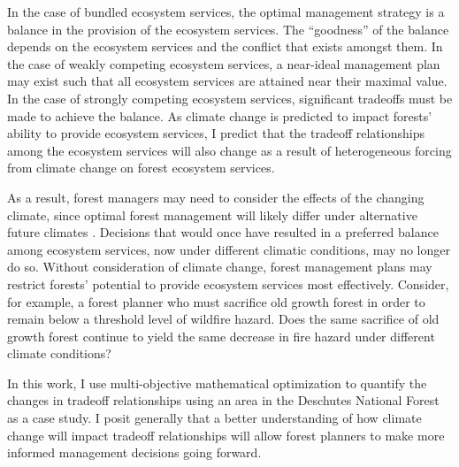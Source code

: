In the case of bundled ecosystem services, the optimal management strategy is a balance in the provision of the ecosystem services. The ``goodness'' of the balance depends on the ecosystem services and the conflict that exists amongst them. In the case of weakly competing ecosystem services, a near-ideal management plan may exist such that all ecosystem services are attained near their maximal value. In the case of strongly competing ecosystem services, significant tradeoffs must be made to achieve the balance. As climate change is predicted to impact forests' ability to provide ecosystem services, I predict that the tradeoff relationships among the ecosystem services will also change as a result of heterogeneous forcing from climate change on forest ecosystem services.

As a result, forest managers may need to consider the effects of the changing climate, since %
optimal forest management will likely differ under alternative future climates \cite{linder2000developing}. Decisions that would once have resulted in a preferred balance among ecosystem services, now under different climatic conditions, may no longer do so. Without consideration of climate change, forest management plans may restrict forests' potential to provide ecosystem services most effectively. Consider, for example, a forest planner who must sacrifice old growth forest in order to remain below a threshold level of wildfire hazard. Does the same sacrifice of old growth forest continue to yield the same decrease in fire hazard under different climate conditions?

In this work, I use multi-objective mathematical optimization to quantify the changes in tradeoff relationships using an area in the Deschutes National Forest as a case study. I posit generally that a better understanding of how climate change will impact tradeoff relationships will allow forest planners to make more informed management decisions going forward.

